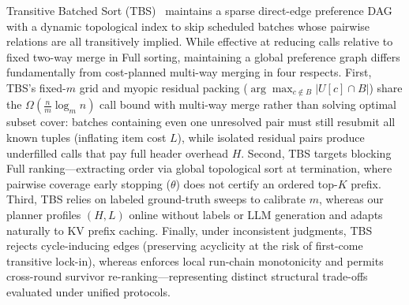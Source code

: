 Transitive Batched Sort (TBS)~\cite{akinola2026tbs} maintains a sparse direct-edge preference DAG with a dynamic topological index to skip scheduled batches whose pairwise relations are all transitively implied. While effective at reducing calls relative to fixed two-way merge in Full sorting, maintaining a global preference graph differs fundamentally from cost-planned multi-way merging in four respects. First, TBS's fixed-$m$ grid and myopic residual packing ($\arg\max_{c\notin B}|U[c]\cap B|$) share the $\Omega(\frac{n}{m}\log_m n)$ call bound with multi-way merge rather than solving optimal subset cover: batches containing even one unresolved pair must still resubmit all known tuples (inflating item cost $L$), while isolated residual pairs produce underfilled calls that pay full header overhead $H$. Second, TBS targets blocking Full ranking—extracting order via global topological sort at termination, where pairwise coverage early stopping ($\theta$) does not certify an ordered top-$K$ prefix. Third, TBS relies on labeled ground-truth sweeps to calibrate $m$, whereas our planner profiles $(H,L)$ online without labels or LLM generation and adapts naturally to KV prefix caching. Finally, under inconsistent judgments, TBS rejects cycle-inducing edges (preserving acyclicity at the risk of first-come transitive lock-in), whereas \LT{} enforces local run-chain monotonicity and \SW{} permits cross-round survivor re-ranking—representing distinct structural trade-offs evaluated under unified protocols.

